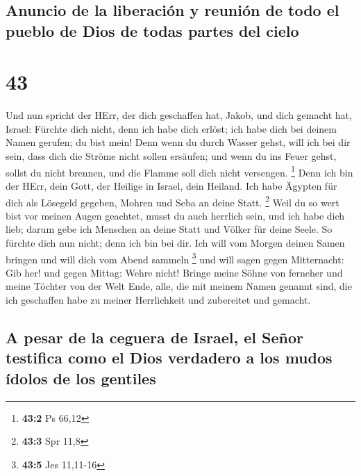 \hypertarget{anuncio-de-la-liberaciuxf3n-y-reuniuxf3n-de-todo-el-pueblo-de-dios-de-todas-partes-del-cielo}{%
\subsection{Anuncio de la liberación y reunión de todo el pueblo de Dios
de todas partes del
cielo}\label{anuncio-de-la-liberaciuxf3n-y-reuniuxf3n-de-todo-el-pueblo-de-dios-de-todas-partes-del-cielo}}

\hypertarget{section-42}{%
\section{43}\label{section-42}}

 Und nun spricht der HErr, der dich geschaffen hat, Jakob,
und dich gemacht hat, Israel: Fürchte dich nicht, denn ich habe dich
erlöst; ich habe dich bei deinem Namen gerufen; du bist mein!
 Denn wenn du durch Wasser gehst, will ich bei dir sein,
dass dich die Ströme nicht sollen ersäufen; und wenn du ins Feuer gehst,
sollst du nicht brennen, und die Flamme soll dich nicht versengen.
\footnote{\textbf{43:2} Ps 66,12}  Denn ich bin der HErr,
dein Gott, der Heilige in Israel, dein Heiland. Ich habe Ägypten für
dich als Lösegeld gegeben, Mohren und Seba an deine Statt. \footnote{\textbf{43:3}
  Spr 11,8}  Weil du so wert bist vor meinen Augen
geachtet, musst du auch herrlich sein, und ich habe dich lieb; darum
gebe ich Menschen an deine Statt und Völker für deine Seele.
 So fürchte dich nun nicht; denn ich bin bei dir. Ich will
vom Morgen deinen Samen bringen und will dich vom Abend sammeln
\footnote{\textbf{43:5} Jes 11,11-16}  und will sagen
gegen Mitternacht: Gib her! und gegen Mittag: Wehre nicht! Bringe meine
Söhne von ferneher und meine Töchter von der Welt Ende, 
alle, die mit meinem Namen genannt sind, die ich geschaffen habe zu
meiner Herrlichkeit und zubereitet und gemacht.

\hypertarget{a-pesar-de-la-ceguera-de-israel-el-seuxf1or-testifica-como-el-dios-verdadero-a-los-mudos-uxeddolos-de-los-gentiles}{%
\subsection{A pesar de la ceguera de Israel, el Señor testifica como el
Dios verdadero a los mudos ídolos de los
gentiles}\label{a-pesar-de-la-ceguera-de-israel-el-seuxf1or-testifica-como-el-dios-verdadero-a-los-mudos-uxeddolos-de-los-gentiles}}

